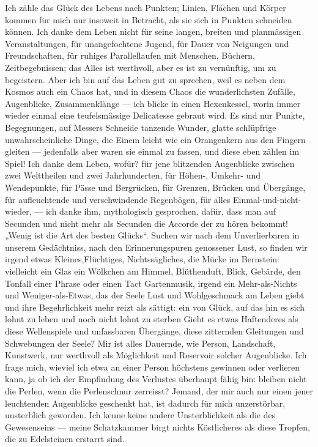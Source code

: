 Ich zähle das Glück des Lebens nach Punkten; Linien, Flächen und Körper kommen für mich nur insoweit in Betracht, als sie sich in Punkten schneiden können. Ich danke dem Leben nicht für seine langen, breiten und planmässigen Veranstaltungen, für unangefochtene Jugend, für Dauer von Neigungen und Freundschaften, für ruhiges Parallellaufen mit Menschen, Büchern, Zeitbegebnissen; das Alles ist werthvoll, aber es ist zu vernünftig, um zu begeistern. Aber ich bin auf das Leben gut zu sprechen, weil es neben dem Kosmos auch ein Chaos hat, und in diesem Chaos die wunderlichsten Zufälle, Augenblicke, Zusammenklänge — ich blicke in einen Hexenkessel, worin immer wieder einmal eine teufelsmässige Delicatesse gebraut wird. Es sind nur Punkte, Begegnungen, auf Messers Schneide tanzende Wunder, glatte schlüpfrige unwahrscheinliche Dinge, die Einem leicht wie ein Orangenkern aus den Fingern gleiten — jedenfalls aber waren sie einmal zu fassen, und diese  eben zählen im Spiel! Ich danke dem Leben, wofür? für jene blitzenden Augenblicke zwischen zwei Welttheilen und zwei Jahrhunderten, für Höhen-, Umkehr- und Wendepunkte, für Pässe und Bergrücken, für Grenzen, Brücken und Übergänge, für aufleuchtende und verschwindende Regenbögen, für alles Einmal-und-nicht-wieder, — ich danke ihm, mythologisch gesprochen, dafür, dass man auf Secunden und nicht mehr als Secunden die Accorde der  zu hören bekommt! „Wenig ist die Art des besten Glücks“. Suchen wir nach dem Unverlierbaren in unserem Gedächtniss, nach den Erinnerungspuren genossener Lust, so finden wir irgend etwas Kleines,Flüchtiges, Nichtssägliches, die Mücke im Bernstein: vielleicht ein Glas  ein Wölkchen am Himmel, Blüthenduft, Blick, Gebärde, den Tonfall einer Phrase oder einen Tact Gartenmusik, irgend ein Mehr-als-Nichts und Weniger-als-Etwas, das der Seele Lust und Wohlgeschmack am Leben giebt und ihre Begehrlichkeit mehr reizt als sättigt: ein  von Glück, auf das hin es sich lohnt zu leben und noch nicht lohnt zu sterben  Giebt es etwas Haftenderes als diese Wellenspiele und unfassbaren Übergänge, diese zitternden Gleitungen und Schwebungen der Seele? Mir ist alles Dauernde, wie Person, Landschaft, Kunstwerk, nur werthvoll als Möglichkeit und Reservoir solcher Augenblicke. Ich frage mich, wieviel ich etwa an einer Person höchstens gewinnen oder verlieren kann, ja ob ich der Empfindung des Verlustes überhaupt fähig bin: bleiben nicht die Perlen, wenn die Perlenschnur zerreisst? Jemand, der mir auch nur einen jener leuchtenden Augenblicke geschenkt hat, ist dadurch für mich unzerstörbar, unsterblich geworden. Ich kenne keine andere Unsterblichkeit als die des Gewesenseins — meine Schatzkammer birgt nichts Köstlicheres als diese Tropfen, die zu Edelsteinen erstarrt sind.
\par

